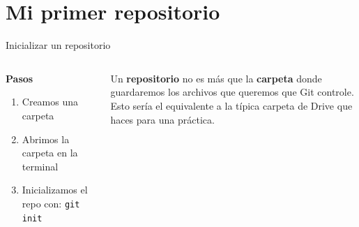 \documentclass[11pt]{beamer}
\begin{document}
\section{Mi primer repositorio}

\begin{frame}{Inicializar un repositorio}
	\begin{columns}[c] 
		\begin{column}{0.45\textwidth} %
			\textbf{Pasos}
			\begin{enumerate}
				\item Creamos una carpeta
				\item Abrimos la carpeta en la terminal
				\item Inicializamos el repo con: \texttt{git init}
			\end{enumerate}
		\end{column}
		\begin{column}{0.5\textwidth} %
			Un \textbf{repositorio} no es más que la \textbf{carpeta} donde guardaremos los archivos que queremos que Git controle.\\ \smallskip
            Esto sería el equivalente a la típica carpeta de Drive que haces para una práctica.
		\end{column}
	\end{columns}
\end{frame}

\end{document}
